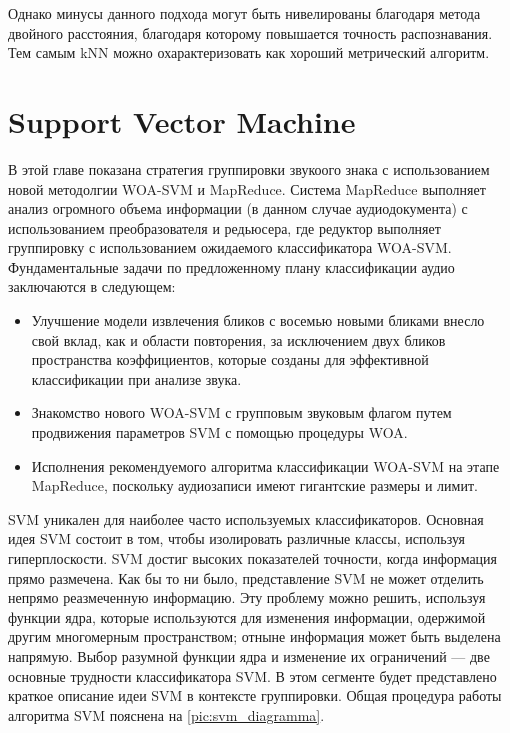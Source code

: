 Однако минусы данного подхода могут быть нивелированы благодаря метода двойного расстояния, 
благодаря которому повышается точность распознавания. Тем самым kNN можно охарактеризовать как
хороший метрический алгоритм.

\section{Support Vector Machine}

В этой главе показана стратегия группировки звукоого знака с использованием новой методолгии
WOA-SVM и MapReduce. Система MapReduce выполняет анализ огромного объема информации 
(в данном случае аудиодокумента) с использованием преобразователя и редьюсера, 
где редуктор выполняет группировку с использованием ожидаемого классификатора WOA-SVM. 
Фундаментальные задачи по предложенному плану классификации аудио заключаются в следующем:

\begin{itemize}
  \item Улучшение модели извлечения бликов с восемью новыми бликами внесло свой вклад, как и области повторения, за исключением двух бликов пространства коэффициентов, которые созданы для эффективной классификации при анализе звука.
  \item Знакомство нового WOA-SVM с групповым звуковым флагом путем продвижения параметров SVM с помощью процедуры WOA.
  \item Исполнения рекомендуемого алгоритма классификации WOA-SVM на этапе MapReduce, поскольку аудиозаписи имеют гигантские размеры и лимит.
\end{itemize}

SVM \cite{svm} уникален для наиболее часто используемых классификаторов. Основная идея SVM состоит в том, 
чтобы изолировать различные классы, используя гиперплоскости. SVM достиг высоких показателей точности, 
когда информация прямо размечена. Как бы то ни было, представление SVM не может отделить непрямо 
реазмеченную информацию. Эту проблему можно решить, используя функции ядра, которые используются 
для изменения информации, одержимой другим многомерным пространством; отныне информация может быть выделена напрямую.
Выбор разумной функции ядра и изменение их ограничений — две основные трудности классификатора SVM. 
В этом сегменте будет представлено краткое описание идеи SVM в контексте группировки. 
Общая процедура работы алгоритма SVM пояснена на \ref{pic:svm_diagramma}.

